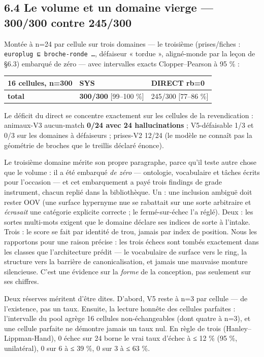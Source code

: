 \documentclass[11pt]{article}
\begin{document}
\subsection*{6.4 Le volume et un domaine vierge — 300/300 contre 245/300}

Montée à n=24 par cellule sur trois domaines — le troisième (prises/fiches : \texttt{europlug ⊑ broche-ronde …}, défaiseur « tordue », aligné-monde par la leçon de §6.3) embarqué de zéro — avec intervalles exacts Clopper–Pearson à 95 \% :

\begin{center}\small\begin{tabular}{lll}\toprule
16 cellules, n=300 & SYS & DIRECT rb=0 \\ \midrule
\textbf{total} & \textbf{300/300} [99–100 \%] & 245/300 [77–86 \%] \\
\bottomrule\end{tabular}\end{center}

Le déficit du direct se concentre exactement sur les cellules de la revendication : animaux-V3 aucun-match \textbf{0/24 avec 24 hallucinations} ; V5-défaisable 1/3 et 0/3 sur les domaines à défaiseurs ; prises-V2 12/24 (le modèle ne connaît pas la géométrie de broches que le treillis déclaré énonce).

Le troisième domaine mérite son propre paragraphe, parce qu'il teste autre chose que le volume : il a été embarqué \emph{de zéro} — ontologie, vocabulaire et tâches écrits pour l'occasion — et cet embarquement a payé trois findings de grade instrument, chacun replié dans la bibliothèque. Un : une inclusion ambiguë doit rester OOV (une surface hypernyme nue se rabattait sur une sorte arbitraire et \emph{écrasait} une catégorie explicite correcte ; le fermé-sur-échec l'a réglé). Deux : les sortes multi-mots exigent que le domaine déclare ses indices de sorte à l'intake. Trois : le score se fait par identité de trou, jamais par index de position. Nous les rapportons pour une raison précise : les trois échecs sont tombés exactement dans les classes que l'architecture prédit — le vocabulaire de surface vers le ring, la structure vers la barrière de canonicalisation, et jamais une mauvaise monture silencieuse. C'est une évidence sur la \emph{forme} de la conception, pas seulement sur ses chiffres.

Deux réserves méritent d'être dites. D'abord, V5 reste à n=3 par cellule — de l'existence, pas un taux. Ensuite, la lecture honnête des cellules parfaites : l'intervalle du pool agrège 16 cellules non-échangeables (dont quatre à n=3), et une cellule parfaite ne démontre jamais un taux nul. En règle de trois (Hanley–Lippman-Hand), 0 échec sur 24 borne le vrai taux d'échec à ≤ 12 \% (95 \%, unilatéral), 0 sur 6 à ≤ 39 \%, 0 sur 3 à ≤ 63 \%.
\end{document}
